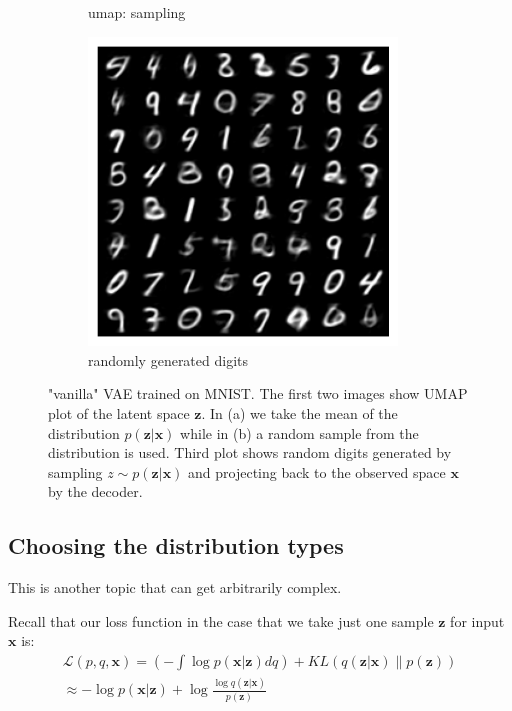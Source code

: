 \documentclass[11pt, a4paper]{report}
\theoremstyle{plain}
\theoremstyle{definition}
\theoremstyle{remark}
\newcommand{\x}{\mathbf{x}}
\newcommand{\z}{\mathbf{z}}
\newcommand{\LL}{\mathcal{L}}
\begin{document}
\begin{figure}[h]
\begin{subfigure}[t]{0.3\textwidth}
\caption{umap: sampling}
\label{fig:vaeumapsamples}
\end{subfigure}
\begin{subfigure}[t]{0.3\textwidth}
\includegraphics[width=0.9\textwidth]{images/vae.generation.mnist.sampling.png}
\caption{randomly generated digits}
\label{fig:vaegen}
\end{subfigure}
\caption{"vanilla" VAE trained on MNIST. The first two images show 
UMAP plot of the latent space $\z$.
In (a) we take the mean of the distribution $p(\z | \x)$ while in (b)
a random sample from the distribution is used.
Third plot shows random digits generated by sampling $z \sim p(\z | \x)$
and projecting back to the observed space $\x$ by the decoder.}
\label{fig:vaeumap}
\end{figure}


\subsection{Choosing the distribution types}
This is another topic that can get arbitrarily complex.

Recall that our loss function in the case that we take just one sample $\z$ for input $\x$
is:
\begin{equation}
\label{eq:vanillavaeloss}
\begin{aligned}
\LL(p,q,\x) 
= (-\int \log p (\x | \z)dq) + KL(q(\z | \x) \| p(\z)) \\
\approx -\log p (\x | \z) + \log \frac{\log q(\z | \x)}{p(\z)}
\end{aligned}
\end{equation}
\end{document}
